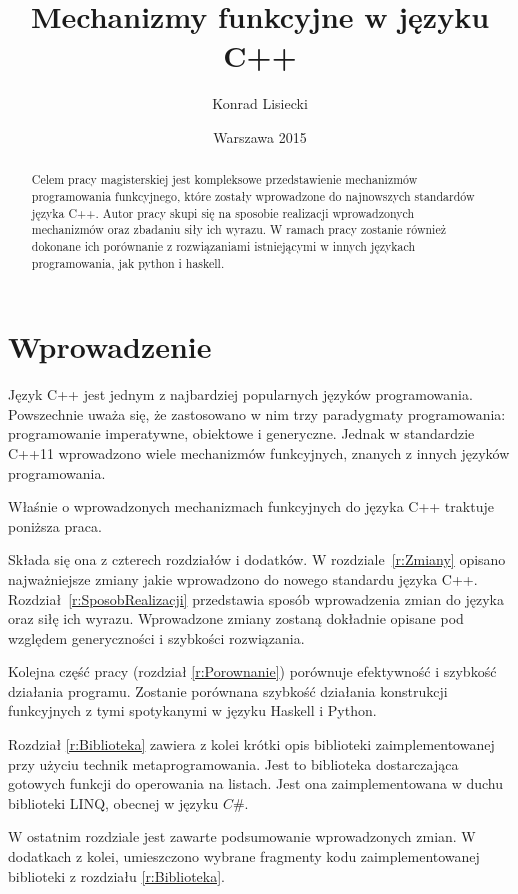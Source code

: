 \documentclass{pracamgr}
\author{Konrad Lisiecki}
\title{Mechanizmy funkcyjne w języku C++}
\date{Warszawa 2015}
\begin{document}
\maketitle

\begin{abstract}
Celem pracy magisterskiej jest kompleksowe przedstawienie mechanizmów programowania 
funkcyjnego, które zostały wprowadzone do najnowszych standardów języka C++. Autor pracy skupi się
na sposobie realizacji wprowadzonych mechanizmów oraz zbadaniu siły ich wyrazu. 
W ramach pracy zostanie również dokonane ich porównanie z rozwiązaniami istniejącymi w innych 
językach programowania, jak python i haskell.
\end{abstract}


\tableofcontents


\chapter*{Wprowadzenie}


Język C++ jest jednym z najbardziej popularnych języków programowania.
Powszechnie uważa się, że zastosowano w nim trzy paradygmaty programowania: programowanie imperatywne, obiektowe i generyczne.
Jednak w standardzie C++11 wprowadzono wiele mechanizmów funkcyjnych, znanych z innych języków programowania.

Właśnie o wprowadzonych mechanizmach funkcyjnych do języka C++ traktuje poniższa praca.

Składa się ona z czterech rozdziałów i dodatków.
W rozdziale~\ref{r:Zmiany} opisano najważniejsze zmiany jakie wprowadzono do nowego standardu języka C++.
Rozdział~\ref{r:SposobRealizacji} przedstawia sposób wprowadzenia zmian do języka oraz siłę ich wyrazu. 
Wprowadzone zmiany zostaną dokładnie opisane pod względem generyczności i szybkości rozwiązania.


Kolejna część pracy (rozdział \ref{r:Porownanie}) porównuje efektywność i szybkość działania programu.
Zostanie porównana szybkość działania konstrukcji funkcyjnych z tymi spotykanymi w języku Haskell i Python.

Rozdział \ref{r:Biblioteka} zawiera z kolei krótki opis biblioteki zaimplementowanej przy użyciu technik 
metaprogramowania. Jest to biblioteka dostarczająca gotowych funkcji do operowania na listach. Jest ona 
zaimplementowana w duchu biblioteki LINQ, obecnej w języku $C\#$. 


W ostatnim rozdziale jest zawarte podsumowanie wprowadzonych zmian. 
W dodatkach z kolei, umieszczono wybrane fragmenty kodu zaimplementowanej biblioteki z rozdziału \ref{r:Biblioteka}.
\end{document}
